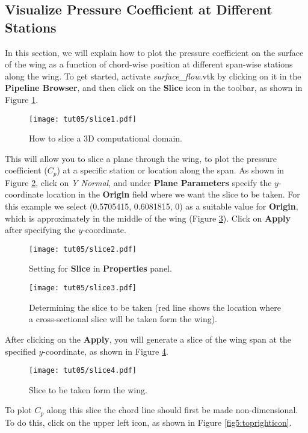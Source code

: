 \subsection{Visualize Pressure Coefficient at Different Stations}
In this section, we will explain how to plot the pressure coefficient on the surface of the wing as a function of chord-wise position at different span-wise stations along the wing. To get started, activate \textit{surface\_flow}.vtk by clicking on it in the \textbf{Pipeline Browser}, and then click on the \textbf{Slice} icon in the toolbar, as shown in Figure \ref{fig5:slice1}.
\begin{figure}[htbp]
    \centering
    \texttt{[image: tut05/slice1.pdf]}
    \caption{How to slice a 3D computational domain.}
    \label{fig5:slice1}
\end{figure}
This will allow you to slice a plane through the wing, to plot the pressure coefficient ($C_p$) at a specific station
or location along the span. As shown in Figure \ref{fig5:slice2}, click on \textit{Y Normal}, and under \textbf{Plane Parameters} specify the $y$-coordinate location in the \textbf{Origin} field where we want the slice to be taken. For this example we select (0.5705415, 0.6081815, 0) as a suitable value for \textbf{Origin}, which is approximately in the middle of the wing (Figure \ref{fig5:slice3}). Click on \textbf{Apply} after specifying the $y$-coordinate.
\begin{figure}[htbp]
    \centering
    \texttt{[image: tut05/slice2.pdf]}
    \caption{Setting for \textbf{Slice} in \textbf{Properties} panel.}
    \label{fig5:slice2}
\end{figure}
\begin{figure}[htbp]
    \centering
    \texttt{[image: tut05/slice3.pdf]}
    \caption{Determining the slice to be taken (red line shows the location where a cross-sectional slice will be taken form the wing).}
    \label{fig5:slice3}
\end{figure}
After clicking on the \textbf{Apply}, you will generate a slice of the wing span at the specified $y$-coordinate, as shown in Figure \ref{fig5:slice4}.
\begin{figure}[htbp]
    \centering
    \texttt{[image: tut05/slice4.pdf]}
    \caption{Slice to be taken form the wing.}
    \label{fig5:slice4}
\end{figure}
To plot $C_p$ along this slice the chord line should first be made non-dimensional. To do this, click on the upper left icon, as shown in Figure \ref{fig5:toprighticon}.
